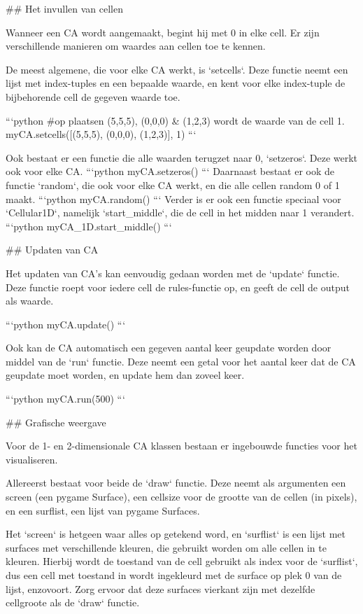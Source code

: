 \documentclass{article}
\begin{document}
\begin{markdown}
## Het invullen van cellen

Wanneer een CA wordt aangemaakt, begint hij met 0 in elke cell. Er zijn verschillende manieren om waardes aan cellen toe te kennen. 

De meest algemene, die voor elke CA werkt, is `setcells`. Deze functie neemt een lijst met index-tuples en een bepaalde waarde, en kent voor elke index-tuple de bijbehorende cell de gegeven waarde toe. 

```python
#op plaatsen (5,5,5), (0,0,0) & (1,2,3) wordt de waarde van de cell 1. 
myCA.setcells([(5,5,5), (0,0,0), (1,2,3)], 1)
```

Ook bestaat er een functie die alle waarden terugzet naar 0, `setzeros`. Deze werkt ook voor elke CA.
```python
myCA.setzeros()
```
Daarnaast bestaat er ook de functie `random`, die ook voor elke CA werkt, en die alle cellen random 0 of 1 maakt. 
```python
myCA.random()
```
Verder is er ook een functie speciaal voor `Cellular1D`, namelijk `start_middle`, die de cell in het midden naar 1 verandert. 
```python
myCA_1D.start_middle()
```

## Updaten van CA

Het updaten van CA's kan eenvoudig gedaan worden met de `update` functie. Deze functie roept voor iedere cell de rules-functie op, en geeft de cell de output als waarde. 

```python
myCA.update()
```

Ook kan de CA automatisch een gegeven aantal keer geupdate worden door middel van de `run` functie. Deze neemt een getal voor het aantal keer dat de CA geupdate moet worden, en update hem dan zoveel keer.

```python
myCA.run(500)
```

## Grafische weergave

Voor de 1- en 2-dimensionale CA klassen bestaan er ingebouwde functies voor het visualiseren. 

Allereerst bestaat voor beide de `draw` functie. Deze neemt als argumenten een screen (een pygame Surface), een cellsize voor de grootte van de cellen (in pixels), en een surflist, een lijst van pygame Surfaces. 

Het `screen` is hetgeen waar alles op getekend word, en `surflist` is een lijst met surfaces met verschillende kleuren, die gebruikt worden om alle cellen in te kleuren. Hierbij wordt de toestand van de cell gebruikt als index voor de `surflist`, dus een cell met toestand in wordt ingekleurd met de surface op plek 0 van de lijst, enzovoort. Zorg ervoor dat deze surfaces vierkant zijn met dezelfde cellgroote als de `draw` functie.


\end{markdown}
\end{document}
